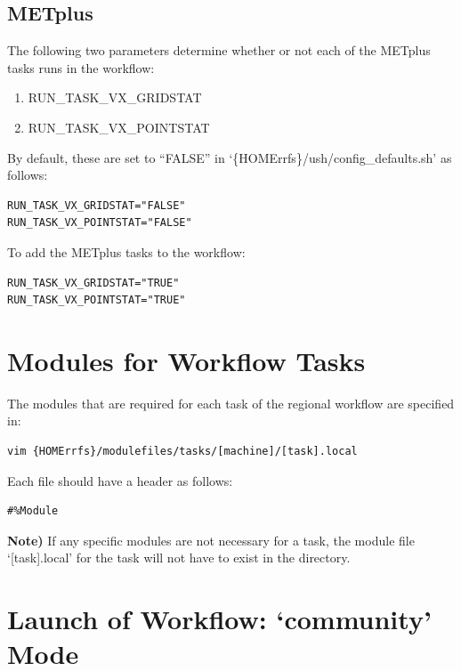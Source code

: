 \documentclass[11pt,fleqn]{report}              %
\begin{document}
\subsection{METplus}
\label{subsec:turn_metplus_tasks}

The following two parameters determine whether or not each of the METplus tasks runs in the workflow:
\begin{enumerate}
\item RUN\_TASK\_VX\_GRIDSTAT
\item RUN\_TASK\_VX\_POINTSTAT
\end{enumerate}

By default, these are set to ``FALSE'' in `\{HOMErrfs\}/ush/config\_defaults.sh' as follows:
\lstset{language=bash}   
\begin{lstlisting}[frame=trBL]
RUN_TASK_VX_GRIDSTAT="FALSE"
RUN_TASK_VX_POINTSTAT="FALSE"
\end{lstlisting}

To add the METplus tasks to the workflow:
\lstset{language=bash}   
\begin{lstlisting}[frame=trBL]
RUN_TASK_VX_GRIDSTAT="TRUE"
RUN_TASK_VX_POINTSTAT="TRUE"
\end{lstlisting}




\section{Modules for Workflow Tasks}
\label{sec:workflow_modulefiles}

The modules that are required for each task of the regional workflow are specified in:
\lstset{language=bash}   
\begin{lstlisting}[frame=trBL]
vim {HOMErrfs}/modulefiles/tasks/[machine]/[task].local
\end{lstlisting}

Each file should have a header as follows:
\lstset{language=bash}   
\begin{lstlisting}[frame=trBL]
#%Module
\end{lstlisting}

{\bf Note)} If any specific modules are not necessary for a task, the module file `[task].local' for the task will not have to exist in the directory.



\section{Launch of Workflow: `community' Mode}
\label{sec:workflow_launch_community}
\end{document}
